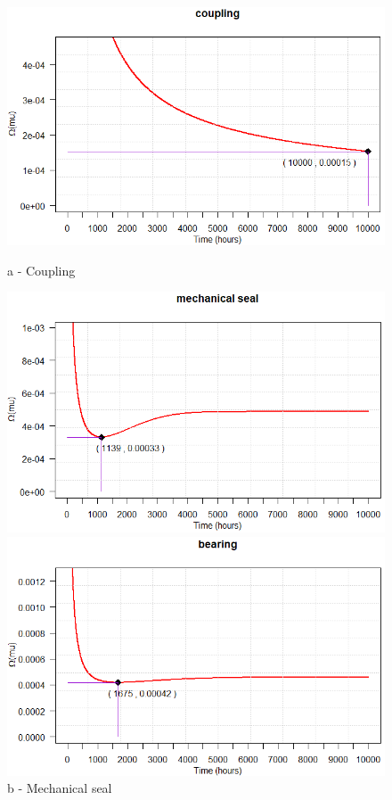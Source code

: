 \begin{figure}[!htb]
	\begin{minipage}[b]{0.5\linewidth}
		\centering
		\includegraphics[width=\textwidth]{figures/ch05_fig_ois_coupling}
		\caption*{a - Coupling}
	\end{minipage}
	\hspace{0.05cm}
	\begin{minipage}[b]{0.5\linewidth}
		\centering
		\includegraphics[width=\textwidth]{figures/ch05_fig_ois_mechseal}
		\caption*{b - Mechanical seal}
	\end{minipage}
	\hspace{0.05cm}
\begin{minipage}[b]{0.5\linewidth}
	\centering
	\includegraphics[width=\textwidth]{figures/ch05_fig_ois_bearing}

\end{minipage}
\end{figure}
